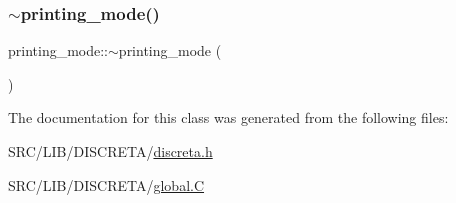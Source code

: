 \subsubsection{\texorpdfstring{$\sim$printing\+\_\+mode()}{~printing\_mode()}}
{\footnotesize\ttfamily printing\+\_\+mode\+::$\sim$printing\+\_\+mode (\begin{DoxyParamCaption}{ }\end{DoxyParamCaption})}



The documentation for this class was generated from the following files\+:\begin{DoxyCompactItemize}
\item 
S\+R\+C/\+L\+I\+B/\+D\+I\+S\+C\+R\+E\+T\+A/\mbox{\hyperlink{discreta_8h}{discreta.\+h}}\item 
S\+R\+C/\+L\+I\+B/\+D\+I\+S\+C\+R\+E\+T\+A/\mbox{\hyperlink{global_8_c}{global.\+C}}\end{DoxyCompactItemize}
